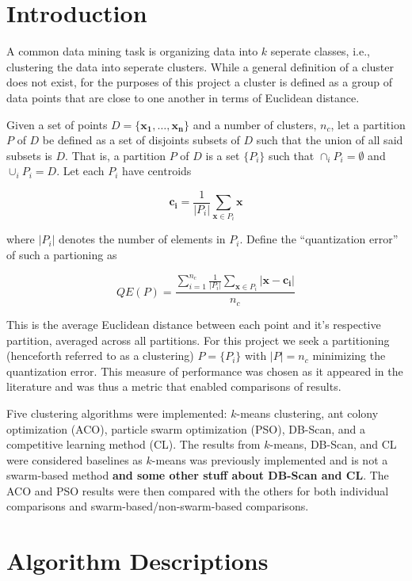 \documentclass[conference]{IEEEtran}
\begin{document}
\section{Introduction}
\label{intro}
A common data mining task is organizing data into $k$ seperate classes, i.e., clustering the data into seperate clusters. While a general definition of a cluster does not exist, for the purposes of this project a cluster is defined as a group of data points that are close to one another in terms of Euclidean distance.

Given a set of points $D = \{\mathbf{x_1}, \ldots, \mathbf{x_n}\}$ and a number of clusters, $n_c$, let a partition $P$ of $D$ be defined as a set of disjoints subsets of $D$ such that the union of all said subsets is $D$. That is, a partition $P$ of $D$ is a set $\{ P_i\}$ such that $\cap_i P_i = \emptyset $ and $\cup_i P_i = D $. Let each $P_i$ have centroids

$$ \mathbf{c_i} = \frac{1}{|P_i|}\sum_{\mathbf{x} \in P_i} \mathbf{x}$$

where $|P_i|$ denotes the number of elements in $P_i$. Define the ``quantization error'' of such a partioning as

$$ QE(P) = \frac{\sum_{i=1}^{n_c} \frac{1}{|P_i|} \sum_{\mathbf{x} \in P_i} |\mathbf{x} - \mathbf{c_i}|}{n_c} $$

This is the average Euclidean distance between each point and it's respective partition, averaged across all partitions. For this project we seek a partitioning (henceforth referred to as a clustering) $P = \{ P_i\}$ with $|P| = n_c$ minimizing the quantization error. This measure of performance was chosen as it appeared in the literature \cite{runkler} and was thus a metric that enabled comparisons of results.

Five clustering algorithms were implemented: $k$-means clustering, ant colony optimization (ACO), particle swarm optimization (PSO), DB-Scan, and a competitive learning method (CL). The results from $k$-means, DB-Scan, and CL were considered baselines as $k$-means was previously implemented and is not a swarm-based method  \textbf{and some other stuff about DB-Scan and CL}. The ACO and PSO results were then compared with the others for both individual comparisons and swarm-based/non-swarm-based comparisons.
  
\section{Algorithm Descriptions}
\end{document}
